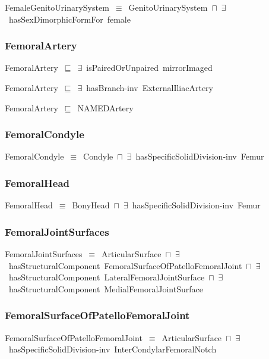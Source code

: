 \documentclass{article}
\begin{document}
FemaleGenitoUrinarySystem~\ensuremath{\equiv}~GenitoUrinarySystem~\ensuremath{\sqcap}~\ensuremath{\exists}~hasSexDimorphicFormFor~female

\subsubsection*{FemoralArtery}

FemoralArtery~\ensuremath{\sqsubseteq}~\ensuremath{\exists}~isPairedOrUnpaired~mirrorImaged~

FemoralArtery~\ensuremath{\sqsubseteq}~\ensuremath{\exists}~hasBranch-inv~ExternalIliacArtery~

FemoralArtery~\ensuremath{\sqsubseteq}~NAMEDArtery~

\subsubsection*{FemoralCondyle}

FemoralCondyle~\ensuremath{\equiv}~Condyle~\ensuremath{\sqcap}~\ensuremath{\exists}~hasSpecificSolidDivision-inv~Femur

\subsubsection*{FemoralHead}

FemoralHead~\ensuremath{\equiv}~BonyHead~\ensuremath{\sqcap}~\ensuremath{\exists}~hasSpecificSolidDivision-inv~Femur

\subsubsection*{FemoralJointSurfaces}

FemoralJointSurfaces~\ensuremath{\equiv}~ArticularSurface~\ensuremath{\sqcap}~\ensuremath{\exists}~hasStructuralComponent~FemoralSurfaceOfPatelloFemoralJoint~\ensuremath{\sqcap}~\ensuremath{\exists}~hasStructuralComponent~LateralFemoralJointSurface~\ensuremath{\sqcap}~\ensuremath{\exists}~hasStructuralComponent~MedialFemoralJointSurface

\subsubsection*{FemoralSurfaceOfPatelloFemoralJoint}

FemoralSurfaceOfPatelloFemoralJoint~\ensuremath{\equiv}~ArticularSurface~\ensuremath{\sqcap}~\ensuremath{\exists}~hasSpecificSolidDivision-inv~InterCondylarFemoralNotch
\end{document}
